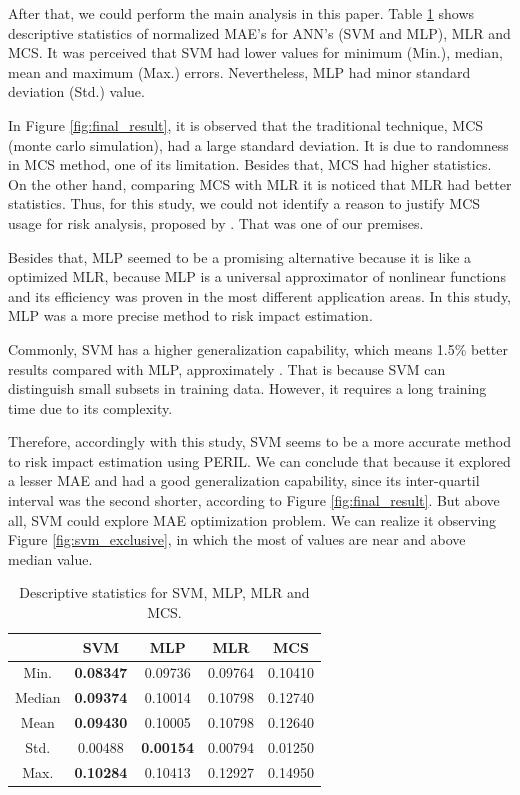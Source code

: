 \documentclass[a4paper,twoside]{article}
\begin{document}
After that, we could perform the main analysis in this paper. Table \ref{tab:final_descriptive} shows descriptive statistics of normalized MAE's for ANN's (SVM and MLP), MLR and MCS. It was perceived that SVM had lower values for minimum (Min.), median, mean and maximum (Max.) errors. Nevertheless, MLP had minor standard deviation (Std.) value.

In Figure \ref{fig:final_result}, it is observed that the traditional technique, MCS (monte carlo simulation), had a large standard deviation. It is due to randomness in MCS method, one of its limitation. Besides that, MCS had higher statistics. On the other hand, comparing MCS with MLR it is noticed that MLR had better statistics. Thus, for this study, we could not identify a reason to justify MCS usage for risk analysis, proposed by \cite{PMBOK2008}. That was one of our premises.

Besides that, MLP seemed to be a promising alternative because it is like a optimized MLR, because MLP is a universal approximator of nonlinear functions and its efficiency was proven in the most different application areas. In this study, MLP was a more precise method to risk impact estimation.

Commonly, SVM has a higher generalization capability, which means 1.5\% better results compared with MLP, approximately \cite{haykin1994neural}. That is because SVM can distinguish small subsets in training data. However, it requires a long training time due to its complexity.

Therefore, accordingly with this study, SVM seems to be a more accurate method to risk impact estimation using PERIL. We can conclude that because it explored a lesser MAE and had a good generalization capability, since its inter-quartil interval was the second shorter, according to Figure \ref{fig:final_result}. But above all, SVM could explore MAE optimization problem. We can realize it observing Figure \ref{fig:svm_exclusive}, in which the most of values are near and above median value.

\begin{table}[h]
\caption{Descriptive statistics for SVM, MLP, MLR and MCS.}\label{tab:final_descriptive} \centering
\begin{tabular}{|c|c|c|c|c|}
  \hline
   & SVM & MLP & MLR & MCS \\
  \hline
  Min. & \textbf{0.08347} & 0.09736 & 0.09764 & 0.10410  \\
  \hline
  Median & \textbf{0.09374} & 0.10014 & 0.10798 & 0.12740 \\
  \hline
  Mean & \textbf{0.09430} & 0.10005 & 0.10798 & 0.12640 \\
  \hline
  Std. & 0.00488 & \textbf{0.00154} & 0.00794 & 0.01250 \\
  \hline
  Max. & \textbf{0.10284} & 0.10413 & 0.12927 & 0.14950 \\
  \hline
\end{tabular}
\end{table}
\end{document}
